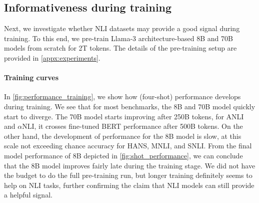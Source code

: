 \subsection{Informativeness during training}\label{subsec:during_training}

Next, we investigate whether NLI datasets may provide a good signal during training.
To this end, we pre-train Llama-3 architecture-based 8B and 70B models from scratch for 2T tokens. The details of the pre-training setup are provided in \cref{appx:experiments}.

\paragraph{Training curves} In \cref{fig:performance_training}, we show how (four-shot) performance develops during training.
We see that for most benchmarks, the 8B and 70B model quickly start to diverge.
The 70B model starts improving after 250B tokens, for ANLI and $\alpha$NLI, it crosses fine-tuned BERT performance after 500B tokens.
On the other hand, the development of performance for the 8B model is slow, at this scale not exceeding chance accuracy for HANS, MNLI, and SNLI.
From the final model performance of 8B depicted in \cref{fig:shot_performance}, we can conclude that the 8B model improves fairly late during the training stage.
We did not have the budget to do the full pre-training run, but longer training definitely seems to help on NLI tasks, further confirming the claim that NLI models can still provide a helpful signal.

